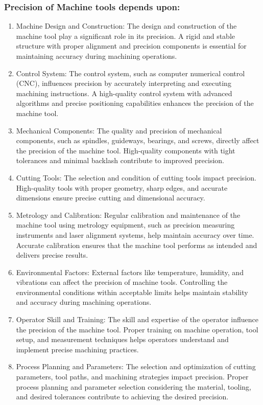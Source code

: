 \documentclass{article}
\begin{document}
\subsubsection*{Precision of Machine tools depends upon:}
\begin{enumerate}
  \item Machine Design and Construction: The design and construction of the machine tool play a significant role in its precision. A rigid and stable structure with proper alignment and precision components is essential for maintaining accuracy during machining operations.

  \item Control System: The control system, such as computer numerical control (CNC), influences precision by accurately interpreting and executing machining instructions. A high-quality control system with advanced algorithms and precise positioning capabilities enhances the precision of the machine tool.
  
  \item Mechanical Components: The quality and precision of mechanical components, such as spindles, guideways, bearings, and screws, directly affect the precision of the machine tool. High-quality components with tight tolerances and minimal backlash contribute to improved precision.
  
  \item Cutting Tools: The selection and condition of cutting tools impact precision. High-quality tools with proper geometry, sharp edges, and accurate dimensions ensure precise cutting and dimensional accuracy.
  
  \item Metrology and Calibration: Regular calibration and maintenance of the machine tool using metrology equipment, such as precision measuring instruments and laser alignment systems, help maintain accuracy over time. Accurate calibration ensures that the machine tool performs as intended and delivers precise results.
  
  \item Environmental Factors: External factors like temperature, humidity, and vibrations can affect the precision of machine tools. Controlling the environmental conditions within acceptable limits helps maintain stability and accuracy during machining operations.
  
  \item Operator Skill and Training: The skill and expertise of the operator influence the precision of the machine tool. Proper training on machine operation, tool setup, and measurement techniques helps operators understand and implement precise machining practices.
  
  \item Process Planning and Parameters: The selection and optimization of cutting parameters, tool paths, and machining strategies impact precision. Proper process planning and parameter selection considering the material, tooling, and desired tolerances contribute to achieving the desired precision.
\end{enumerate}
\end{document}
